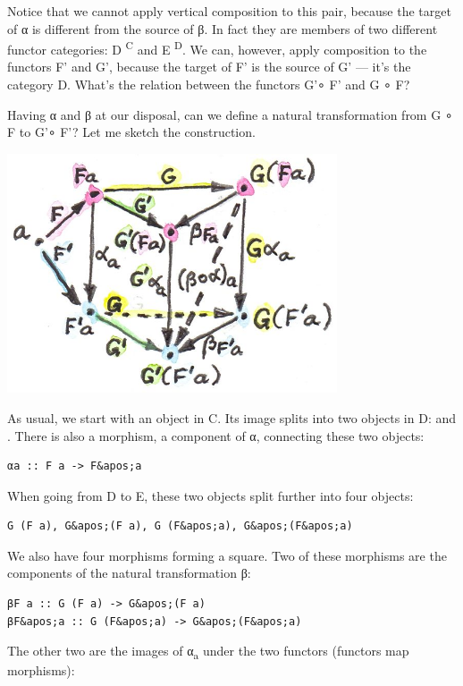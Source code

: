 Notice that we cannot apply vertical composition to this pair, because
the target of α is different from the source of β. In fact they are
members of two different functor categories: D \textsuperscript{C} and E
\textsuperscript{D}. We can, however, apply composition to the functors
F' and G', because the target of F' is the source of G' --- it's the
category D. What's the relation between the functors G'∘ F' and G ∘ F?

Having α and β at our disposal, can we define a natural transformation
from G ∘ F to G'∘ F'? Let me sketch the construction.

\includegraphics[width=3.84375in]{images/9_horizontal.jpg}

As usual, we start with an object  in C. Its image splits into
two objects in D:  and . There is also a
morphism, a component of α, connecting these two objects:

\begin{verbatim}
αa :: F a -> F&apos;a
\end{verbatim}

When going from D to E, these two objects split further into four
objects:

\begin{verbatim}
G (F a), G&apos;(F a), G (F&apos;a), G&apos;(F&apos;a)
\end{verbatim}

We also have four morphisms forming a square. Two of these morphisms are
the components of the natural transformation β:

\begin{verbatim}
βF a :: G (F a) -> G&apos;(F a)
βF&apos;a :: G (F&apos;a) -> G&apos;(F&apos;a)
\end{verbatim}

The other two are the images of α\textsubscript{a} under the two
functors (functors map morphisms):

